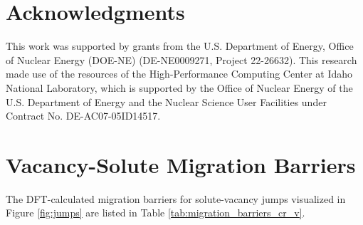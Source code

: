 \documentclass[preprint,12pt]{elsarticle}
\begin{document}
\FloatBarrier
\section{Acknowledgments}

This work was supported by grants from the U.S. Department of Energy, Office of Nuclear Energy (DOE-NE) (DE-NE0009271, Project 22-26632). This research made use of the resources of the High-Performance Computing Center at Idaho National Laboratory, which is supported by the Office of Nuclear Energy of the U.S. Department of Energy and the Nuclear Science User Facilities under Contract No. DE-AC07-05ID14517.

\appendix
\setcounter{table}{0}

\section{Vacancy-Solute Migration Barriers}
\label{appendix:migration_barriers}
The DFT-calculated migration barriers for solute-vacancy jumps visualized in Figure \ref{fig:jumps} are listed in Table \ref{tab:migration_barriers_cr_v}.
\end{document}
